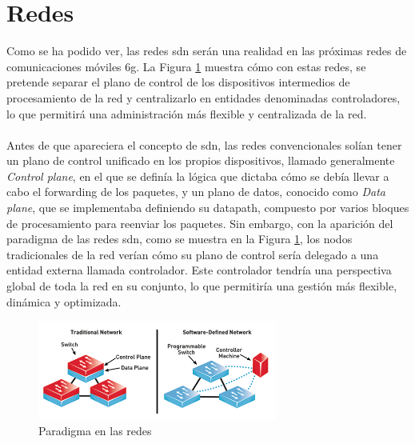\section{Redes }
\label{sec:6gIoT_sdn}


Como se ha podido ver, las redes \gls{sdn} serán una realidad en las próximas redes de comunicaciones móviles \gls{6g}. La Figura \ref{fig:sdnParadig} muestra cómo con estas redes, se pretende separar el plano de control de los dispositivos intermedios de procesamiento de la red y centralizarlo en entidades denominadas controladores, lo que permitirá una administración más flexible y centralizada de la red.\\
\\
Antes de que apareciera el concepto de \gls{sdn}, las redes convencionales solían tener un plano de control unificado en los propios dispositivos, llamado generalmente \textit{Control plane}, en el que se definía la lógica que dictaba cómo se debía llevar a cabo el forwarding de los paquetes, y un plano de datos, conocido como \textit{Data plane}, que se implementaba definiendo su datapath, compuesto por varios bloques de procesamiento para reenviar los paquetes. Sin embargo, con la aparición del paradigma de las redes \gls{sdn}, como se muestra en la Figura \ref{fig:sdnParadig}, los nodos tradicionales de la red verían cómo su plano de control sería delegado a una entidad externa llamada controlador. Este controlador tendría una perspectiva global de toda la red en su conjunto, lo que permitiría una gestión más flexible, dinámica y optimizada.

\begin{figure}[ht]
    \centering
    \includegraphics[width=0.7\textwidth]{archivos/img/intro/sdn.png}
    \caption{Paradigma en las redes  \cite{carrascal2020diseno}}
    \label{fig:sdnParadig}
\end{figure}

